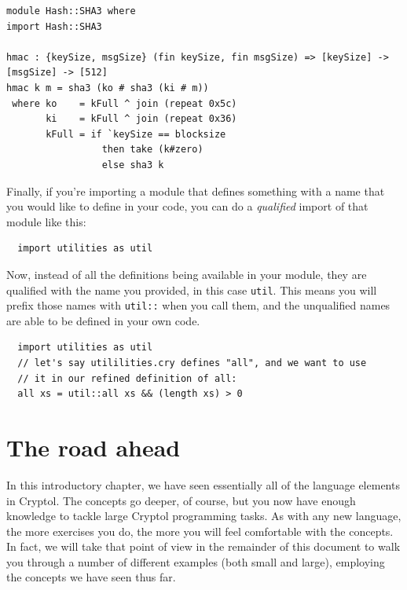 \begin{verbatim}
module Hash::SHA3 where
import Hash::SHA3

hmac : {keySize, msgSize} (fin keySize, fin msgSize) => [keySize] -> [msgSize] -> [512]
hmac k m = sha3 (ko # sha3 (ki # m))
 where ko    = kFull ^ join (repeat 0x5c)
       ki    = kFull ^ join (repeat 0x36)
       kFull = if `keySize == blocksize
                 then take (k#zero)
                 else sha3 k
\end{verbatim}

Finally, if you're importing a module that defines something with
a name that you would like to define in your code, you can do a
{\it qualified} import of that module like this:

\begin{verbatim}
  import utilities as util
\end{verbatim}

Now, instead of all the definitions being available in your module,
they are qualified with the name you provided, in this case \verb+util+.
This means you will prefix those names with \verb+util::+ when you call them,
and the unqualified names are able to be defined in your own code.

\begin{verbatim}
  import utilities as util
  // let's say utililities.cry defines "all", and we want to use
  // it in our refined definition of all:
  all xs = util::all xs && (length xs) > 0
\end{verbatim}

\section{The road ahead}
\label{sec:road-ahead}

In this introductory chapter, we have seen essentially all of the
language elements in Cryptol. The concepts go deeper, of course, but
you now have enough knowledge to tackle large Cryptol programming
tasks. As with any new language, the more exercises you do, the more
you will feel comfortable with the concepts. In fact, we will take
that point of view in the remainder of this document to walk you
through a number of different examples (both small and large),
employing the concepts we have seen thus far.

